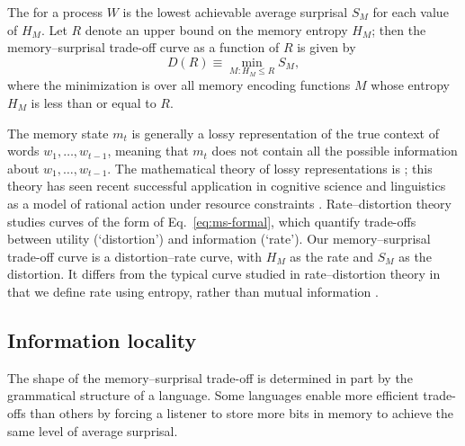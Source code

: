\begin{definition}
The  for a process $W$ is the lowest achievable average surprisal $S_M$ for each value of $H_M$. Let $R$ denote an upper bound on the memory entropy $H_M$; then the memory--surprisal trade-off curve as a function of $R$ is given by
\begin{equation}
    \label{eq:ms-formal}
    D(R) \equiv \min_{M : H_M \le R} S_M,
\end{equation}
where the minimization is over all memory encoding functions $M$ whose entropy $H_M$ is less than or equal to $R$.
\end{definition}

The memory state $m_t$ is generally a lossy representation of the true context of words $w_1, \dots, w_{t-1}$, meaning that $m_t$ does not contain all the possible information about $w_1, \dots, w_{t-1}$. The mathematical theory of lossy representations is  \citep[for an overview and key results, see][pp. 301--347]{cover2006elements}; this theory has seen recent successful application in cognitive science and linguistics as a model of rational action under resource constraints \citep{sims,gershman,zaslavsky2018efficient}. Rate--distortion theory studies curves of the form of Eq.~\ref{eq:ms-formal}, which quantify trade-offs between utility (`distortion') and information (`rate'). Our memory--surprisal trade-off curve is a distortion--rate curve, with $H_M$ as the rate and $S_M$ as the distortion. It differs from the typical curve studied in rate--distortion theory in that we define rate using entropy, rather than mutual information \citep[see][for a discussion of some of the consequences of this formulation]{strouse-deterministic-2017}.  


\subsection{Information locality}
\label{sec:infoloc}

The shape of the memory--surprisal trade-off is determined in part by the grammatical structure of a language.
Some languages enable more efficient trade-offs than others by forcing a listener to store more bits in memory to achieve the same level of average surprisal.


